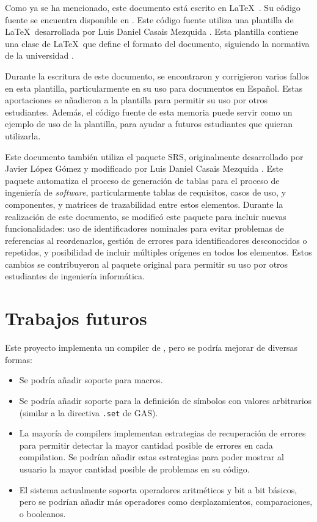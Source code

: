 Como ya se ha mencionado, este documento está escrito en
\LaTeX~\parencite{latex}. Su código fuente se encuentra disponible en
\myreportrepo. Este código fuente utiliza una plantilla de \LaTeX~desarrollada
por Luis Daniel Casais Mezquida \parencite{UC3Mtemplate}. Esta plantilla
contiene una clase de \LaTeX~que define el formato del documento, siguiendo la
normativa de la universidad \parencite{report-guidelines}.

Durante la escritura de este documento, se encontraron y corrigieron varios
fallos en esta plantilla, particularmente en su uso para documentos en Español.
Estas aportaciones se añadieron a la plantilla para permitir su uso por otros
estudiantes. Además, el código fuente de esta memoria puede servir como un
ejemplo de uso de la plantilla, para ayudar a futuros estudiantes que quieran
utilizarla.

Este documento también utiliza el paquete SRS, originalmente desarrollado por
Javier López Gómez y modificado por Luis Daniel Casais Mezquida
\parencite{srs-package}. Este paquete automatiza el proceso de generación de
tablas para el proceso de ingeniería de \textit{software}, particularmente
tablas de requisitos, casos de uso, y componentes, y matrices de trazabilidad
entre estos elementos. Durante la realización de este documento, se modificó
este paquete para incluir nuevas funcionalidades: uso de identificadores
nominales para evitar problemas de referencias al reordenarlos, gestión de
errores para identificadores desconocidos o repetidos, y posibilidad de incluir
múltiples orígenes en todos los elementos. Estos cambios se contribuyeron al
paquete original para permitir su uso por otros estudiantes de ingeniería
informática.

\section{Trabajos futuros}\label{sec:future-work}

Este proyecto implementa un \gls{compiler} de ,
pero se podría mejorar de diversas formas:

\begin{itemize}
    \item Se podría añadir soporte para \glspl{macro}.
    \item Se podría añadir soporte para la definición de símbolos con valores
    arbitrarios (similar a la directiva \verb!.set! de \gls{GAS}).
    \item La mayoría de \glspl{compiler} implementan estrategias de recuperación
    de errores para permitir detectar la mayor cantidad posible de errores en
    cada \gls{compilation}. Se podrían añadir estas estrategias para poder
    mostrar al usuario la mayor cantidad posible de problemas en su código.
    \item El sistema actualmente soporta operadores aritméticos y bit a bit
    básicos, pero se podrían añadir más operadores como desplazamientos,
    comparaciones, o booleanos.
\end{itemize}

